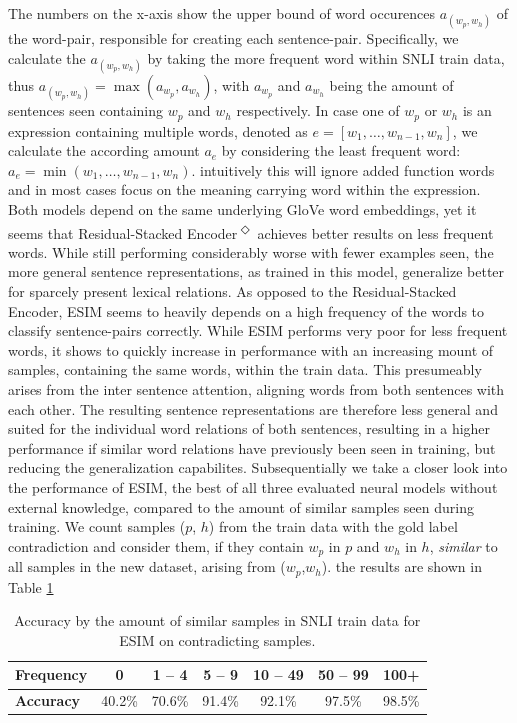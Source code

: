 The numbers on the x-axis show the upper bound of word occurences $a_{(w_p,w_h)}$ of the word-pair, responsible for creating each sentence-pair. Specifically, we calculate the $a_{(w_p,w_h)}$ by taking the more frequent word within \ac{SNLI} train data, thus $a_{(w_p,w_h)} = \max(a_{w_p},a_{w_h})$, with $a_{w_p}$ and $a_{w_h}$ being the amount of sentences seen containing $w_p$ and $w_h$ respectively. In case one of $w_p$ or $w_h$ is an expression containing multiple words, denoted as $e = [w_1, \ldots , w_{n-1}, w_{n}]$, we calculate the according amount $a_e$ by considering the least frequent word: $a_e = \min(w_1, \ldots , w_{n-1}, w_n)$. intuitively this will ignore added function words and in most cases focus on the meaning carrying word within the expression. Both models depend on the same underlying GloVe word embeddings, yet it seems that Residual-Stacked Encoder\textsuperscript{$\Diamond$} achieves better results on less frequent words.  While still performing considerably worse with fewer examples seen, the more general sentence representations, as trained in this model, generalize better for sparcely present lexical relations. As opposed to the Residual-Stacked Encoder, ESIM seems to heavily depends on a high frequency of the words to classify sentence-pairs correctly.  While ESIM performs very poor for less frequent words, it shows to quickly increase in performance with an increasing mount of samples, containing the same words, within the train data. This presumeably arises from the inter sentence attention, aligning words from both sentences with each other. The resulting sentence representations are therefore less general and suited for the individual word relations of both sentences, resulting in a higher performance if similar word relations have previously been seen in training, but reducing the generalization capabilites. Subsequentially we take a closer look into the performance of ESIM, the best of all three evaluated neural models without external knowledge, compared to the amount of similar samples seen during training. We count samples ($p$, $h$) from the train data with the gold label contradiction and consider them, if they contain $w_p$ in $p$ and $w_h$ in $h$, \textit{similar} to all samples in the new dataset, arising from ($w_p$,$w_h$). the results are shown in Table \ref{tab:esim_acc_by_sim_samples}
\begin{table}[tph!]
\centering
\begin{tabular}{l|c|c|c|c|c|c}
\toprule
\textbf{Frequency} & 0 & 1 -- 4 & 5 -- 9 & 10 -- 49 & 50 -- 99 & 100+ \\
\midrule
\textbf{Accuracy} & 40.2\% & 70.6\% & 91.4\% & 92.1\% & 97.5\% & 98.5\% \\
\bottomrule
\end{tabular}
\label{tab:esim_acc_by_sim_samples}
\caption{Accuracy by the amount of similar samples in \ac{SNLI} train data for ESIM on contradicting samples.}
\end{table}

